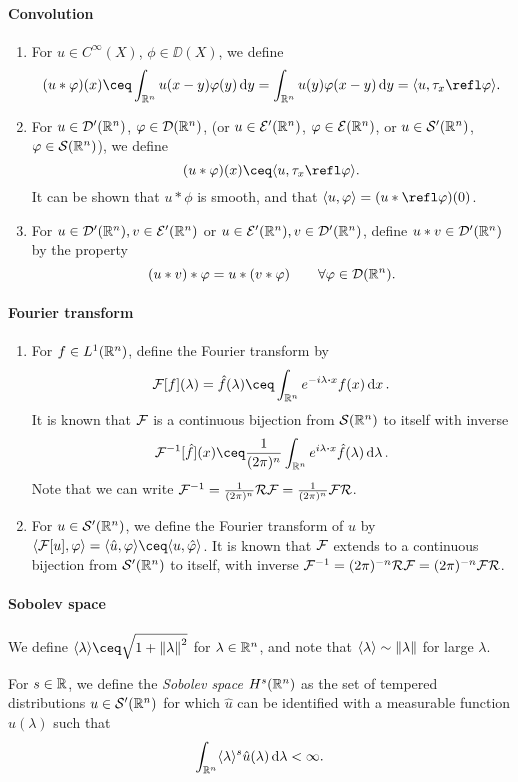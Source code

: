 \paragraph{Convolution} 
\begin{enumerate}
	\item For $u \in C^\infty(X)$, $\phi \in \DD(X)$, we define 
	\[
	(u * \phi)(x) \ceq \int_{\RR^n} u(x-y) \phi(y) \dd{y} = \int_{\RR^n} u(y) \phi(x-y) \dd{y} = \ang{u, \tau_x \refl\phi}.
	\]
	\item For $u \in \mathcal D'(\mathbb R^n)$, $\varphi \in \mathcal D(\mathbb R^n)$, (or $u \in \mathcal E'(\mathbb R^n)$, $\varphi \in \mathcal E(\mathbb R^n)$, or $u \in \mathcal S'(\mathbb R^n)$, $\varphi \in \mathcal S(\mathbb R^n)$), we define
	\[
	(u* \phi)(x) \ceq \ang{u, \tau_x \refl\phi}. 
	\]
	It can be shown that $u * \phi$ is smooth, and that $\ang{u, \phi} = (u * \refl\phi)(0)$. 
	\item For $u \in \mathcal D'(\mathbb R^n), v \in \mathcal E'(\mathbb R^n)$ or $u \in \mathcal E'(\mathbb R^n), v \in \mathcal D'(\mathbb R^n)$, define $u * v \in \mathcal D'(\mathbb R^n)$  by the property
	\[
	(u * v) * \varphi = u * (v * \varphi) \qquad\forall \varphi\in \mathcal D(\mathbb R^n). 
	\]
\end{enumerate}

\paragraph{Fourier transform}
\begin{enumerate}
	\item For $f \in L^1(\mathbb R^n)$, define the Fourier transform by
	\[
	\FF[f](\lambda) = \hat f(\lambda) \ceq \int_{\RR^n} e^{-i\lambda\vdot x} f(x) \dd{x}. 
	\]
	It is known that $\mathcal F$ is a continuous bijection from $\mathcal S(\mathbb R^n)$ to itself with inverse
	\[
	\FF^{-1}[\hat f](x) \ceq \frac1{(2\pi)^n} \int_{\RR^n} e^{i\lambda \vdot x} \hat f(\lambda) \dd{\lambda}. 
	\]
	Note that we can write $\mathcal F^{-1} = \frac1{(2\pi)^n} \mathcal R \mathcal F = \frac1{(2\pi)^n} \mathcal F \mathcal R$. 
	
	\item For $u \in \mathcal S'(\mathbb R^n)$, we define the Fourier transform of $u$ by 
	$\ang{\FF[u], \phi} = \ang{\hat u, \phi} \ceq \ang{u, \hat\phi}$. It is known that $\mathcal F$ extends to a continuous bijection from $\mathcal S'(\mathbb R^n)$ to itself, with inverse $\mathcal F^{-1} = (2\pi)^{-n} \mathcal R \mathcal F = (2\pi)^{-n} \mathcal F \mathcal R$. 
\end{enumerate}

\paragraph{Sobolev space}
We define $\ang{\lambda} \ceq \sqrt{1 + \norm{\lambda}^2}$ for $\lambda \in \mathbb R^n$, and note that $\langle\lambda\rangle \sim \norm{\lambda}$ for large $\lambda$. 

For $s \in \mathbb R$, we define the \emph{Sobolev space} $H^s(\mathbb R^n)$ as the set of tempered distributions $u \in \mathcal S'(\mathbb R^n)$ for which $\hat u$ can be identified with a measurable function $\hat u(\lambda)$ such that 
\[
\int_{\mathbb R^n} \langle\lambda\rangle^s \hat u(\lambda) \dd{\lambda} < \infty. 
\]

